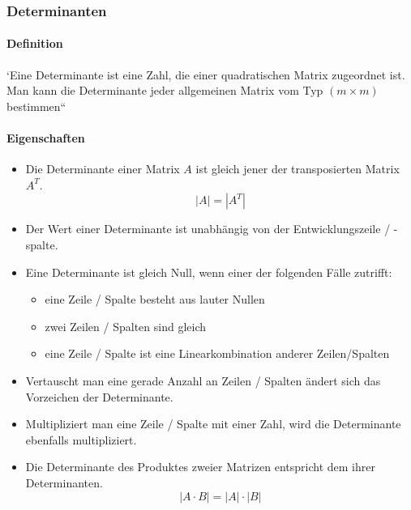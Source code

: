 \documentclass{school}
\begin{document}
\newpage
\subsubsection{Determinanten}
\paragraph{Definition}
\begin{center}
`Eine Determinante ist eine Zahl, die einer quadratischen Matrix zugeordnet ist.
Man kann die Determinante jeder allgemeinen Matrix vom Typ $(m \times m)$ bestimmen``~\cite{determinante}
\end{center}

\paragraph{Eigenschaften}
\begin{itemize}
    \item Die Determinante einer Matrix $A$ ist gleich jener der transposierten Matrix $A^T$. $$|A| = |A^T|$$
    \item Der Wert einer Determinante ist unabhängig von der Entwicklungszeile / -spalte.
    \item Eine Determinante ist gleich Null, wenn einer der folgenden Fälle zutrifft:
    \begin{itemize}
        \item eine Zeile / Spalte besteht aus lauter Nullen
        \item zwei Zeilen / Spalten sind gleich
        \item eine Zeile / Spalte ist eine Linearkombination anderer Zeilen/Spalten
    \end{itemize}
    \item Vertauscht man eine gerade Anzahl an Zeilen / Spalten ändert sich das Vorzeichen der Determinante.
    \item Multipliziert man eine Zeile / Spalte mit einer Zahl, wird die Determinante ebenfalls multipliziert.
    \item Die Determinante des Produktes zweier Matrizen entspricht dem ihrer Determinanten. $$|A \cdot B| = |A| \cdot |B|$$
\end{itemize}

\newpage
\end{document}
